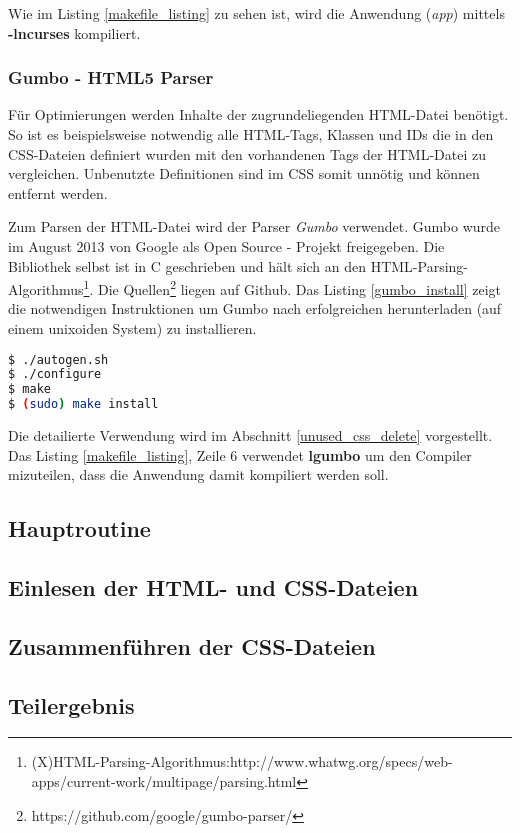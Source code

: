 Wie im Listing \ref{makefile_listing} zu sehen ist, wird die Anwendung (\textit{app}) mittels \textbf{-lncurses} kompiliert. 

\subsubsection{Gumbo - HTML5 Parser}
Für Optimierungen werden Inhalte der zugrundeliegenden HTML-Datei benötigt. So ist es beispielsweise notwendig alle HTML-Tags, Klassen und IDs die in den CSS-Dateien definiert wurden mit den vorhandenen Tags der HTML-Datei zu vergleichen. Unbenutzte Definitionen sind im CSS somit unnötig und können entfernt werden.

Zum Parsen der HTML-Datei wird der Parser \textit{Gumbo} verwendet. Gumbo wurde im August 2013 von Google als Open Source - Projekt freigegeben. Die Bibliothek selbst ist in C geschrieben und hält sich an den HTML-Parsing-Algorithmus\footnote{(X)HTML-Parsing-Algorithmus:http://www.whatwg.org/specs/web-apps/current-work/multipage/parsing.html}. Die Quellen\footnote{https://github.com/google/gumbo-parser/} liegen auf Github. Das Listing \ref{gumbo_install} zeigt die notwendigen Instruktionen um Gumbo nach erfolgreichen herunterladen (auf einem unixoiden System) zu installieren.

\begin{lstlisting}[label=gumbo_install,language=bash, caption=Installation der gumbo Bibliothek]
$ ./autogen.sh
$ ./configure
$ make
$ (sudo) make install
\end{lstlisting}

Die detailierte Verwendung wird im Abschnitt \ref{unused_css_delete} vorgestellt. Das Listing \ref{makefile_listing}, Zeile 6 verwendet \textbf{lgumbo} um den Compiler mizuteilen, dass die Anwendung damit kompiliert werden soll. 

\subsection{Hauptroutine}

\subsection{Einlesen der HTML- und CSS-Dateien}

\subsection{Zusammenführen der CSS-Dateien}

\subsection{Teilergebnis}

